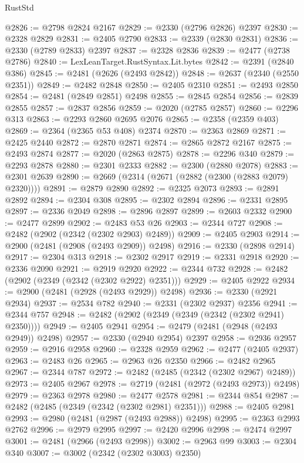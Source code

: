 \begin{lexlean}{RustStd}
\begin{coremodule}
@2826 := @2798 @2824 @2167
@2829 := @2330 (@2796 @2826) @2397
@2830 := @2328 @2829
@2831 := @2405 @2790
@2833 := @2339 (@2830 @2831)
@2836 := @2330 (@2789 @2833) @2397
@2837 := @2328 @2836
@2839 := @2477 (@2738 @2786)
@2840 := LexLeanTarget.RustSyntax.Lit.bytes
@2842 := @2391 (@2840 @386)
@2845 := @2481 (@2626 (@2493 @2842))
@2848 := @2637 (@2340 (@2550 @2351))
@2849 := @2482 @2848
@2850 := @2405 @2310
@2851 := @2493 @2850
@2854 := @2481 (@2849 @2851) @2498
@2855 := @2845 @2854
@2856 := @2839 @2855
@2857 := @2837 @2856
@2859 := @2020 (@2785 @2857)
@2860 := @2296 @313
@2863 := @2293 @2860 @2695 @2076
@2865 := @2358 (@2359 @403)
@2869 := @2364 (@2365 @53 @408) @2374
@2870 := @2363 @2869
@2871 := @2425 @2440
@2872 := @2870 @2871
@2874 := @2865 @2872 @2167
@2875 := @2493 @2874
@2877 := @2020 (@2863 @2875)
@2878 := @2296 @340
@2879 := @2293 @2878
@2880 := @2301 @2333
@2882 := @2300 (@2880 @2078)
@2883 := @2301 @2639
@2890 := @2669 (@2314 (@2671 (@2882 (@2300 (@2883 @2079) @2320))))
@2891 := @2879 @2890
@2892 := @2325 @2073
@2893 := @2891 @2892
@2894 := @2304 @308
@2895 := @2302 @2894
@2896 := @2331 @2895
@2897 := @2336 @2049
@2898 := @2896 @2897
@2899 := @2603 @2332
@2900 := @2477 @2899
@2902 := @2483 @53 @26
@2903 := @2344 @727
@2908 := @2482 (@2902 (@2342 (@2302 @2903) @2489))
@2909 := @2405 @2903
@2914 := @2900 (@2481 (@2908 (@2493 @2909)) @2498)
@2916 := @2330 (@2898 @2914)
@2917 := @2304 @313
@2918 := @2302 @2917
@2919 := @2331 @2918
@2920 := @2336 @2090
@2921 := @2919 @2920
@2922 := @2344 @732
@2928 := @2482 (@2902 (@2349 (@2342 (@2302 @2922) @2351)))
@2929 := @2405 @2922
@2934 := @2900 (@2481 (@2928 (@2493 @2929)) @2498)
@2936 := @2330 (@2921 @2934)
@2937 := @2534 @782
@2940 := @2331 (@2302 @2937) @2356
@2941 := @2344 @757
@2948 := @2482 (@2902 (@2349 (@2349 (@2342 (@2302 @2941) @2350))))
@2949 := @2405 @2941
@2954 := @2479 (@2481 (@2948 (@2493 @2949)) @2498)
@2957 := @2330 (@2940 @2954) @2397
@2958 := @2936 @2957
@2959 := @2916 @2958
@2960 := @2328 @2959
@2962 := @2477 (@2405 @2937)
@2963 := @2483 @26
@2965 := @2963 @26 @2350
@2966 := @2482 @2965
@2967 := @2344 @787
@2972 := @2482 (@2485 (@2342 (@2302 @2967) @2489))
@2973 := @2405 @2967
@2978 := @2719 (@2481 (@2972 (@2493 @2973)) @2498)
@2979 := @2363 @2978
@2980 := @2477 @2578
@2981 := @2344 @854
@2987 := @2482 (@2485 (@2349 (@2342 (@2302 @2981) @2351)))
@2988 := @2405 @2981
@2993 := @2980 (@2481 (@2987 (@2493 @2988)) @2498)
@2995 := @2363 @2993 @2762
@2996 := @2979 @2995
@2997 := @2420 @2996
@2998 := @2474 @2997
@3001 := @2481 (@2966 (@2493 @2998))
@3002 := @2963 @99
@3003 := @2304 @340
@3007 := @3002 (@2342 (@2302 @3003) @2350)

\end{coremodule}
\end{lexlean}
